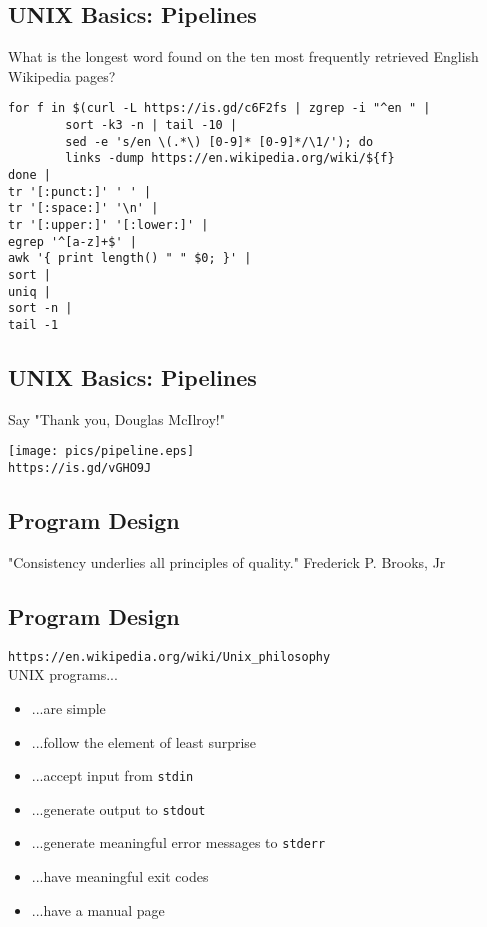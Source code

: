 \documentclass[sxga]{xdvislides}
\begin{document}
\subsection{UNIX Basics: Pipelines}
What is the longest word found on the ten most
frequently retrieved English Wikipedia pages?
\begin{verbatim}
for f in $(curl -L https://is.gd/c6F2fs | zgrep -i "^en " |
        sort -k3 -n | tail -10 |
        sed -e 's/en \(.*\) [0-9]* [0-9]*/\1/'); do
        links -dump https://en.wikipedia.org/wiki/${f}
done |
tr '[:punct:]' ' ' |
tr '[:space:]' '\n' |
tr '[:upper:]' '[:lower:]' |
egrep '^[a-z]+$' |
awk '{ print length() " " $0; }' |
sort |
uniq |
sort -n |
tail -1
\end{verbatim}

\subsection{UNIX Basics: Pipelines}
Say "Thank you, Douglas McIlroy!"
\begin{center}
\texttt{[image: pics/pipeline.eps]} \\
\verb+https://is.gd/vGHO9J+ \\
\end{center}



\subsection{Program Design}
\vspace*{\fill}
\Huge
\begin{center}
"Consistency underlies all principles of quality." Frederick P. Brooks, Jr
\end{center}
\Normalsize
\vspace*{\fill}


\subsection{Program Design}
\verb+https://en.wikipedia.org/wiki/Unix_philosophy+ \\

UNIX programs...
\begin{itemize}
	\item ...are simple
	\item ...follow the element of least surprise
	\item ...accept input from {\tt stdin}
	\item ...generate output to {\tt stdout}
	\item ...generate meaningful error messages to {\tt stderr}
	\item ...have meaningful exit codes
	\item ...have a manual page
\end{itemize}
\end{document}
